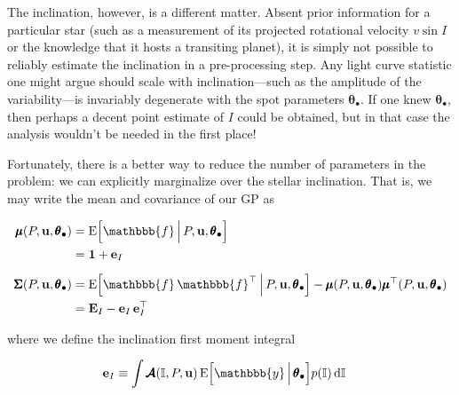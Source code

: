\documentclass[modern,linenumbers]{aastex62}
\begin{document}
The inclination, however, is a different matter. Absent prior information
for a particular star (such as a measurement of its projected rotational
velocity $v\sin I$ or the knowledge that it hosts a transiting planet), it
is simply not possible to reliably estimate the inclination in a
pre-processing step. Any light curve statistic one might argue should scale
with inclination---such as the amplitude of the variability---is invariably
degenerate with the spot parameters $\pmb{\theta}_\bullet$. If one knew
$\pmb{\theta}_\bullet$, then perhaps a decent point estimate of $I$ could
be obtained, but in that case the analysis wouldn't be needed in the first place!
%

Fortunately, there is a better way to reduce the number of parameters in
the problem: we can explicitly marginalize over the stellar inclination.
That is, we may write the mean and covariance of our GP as
%
%
\begin{linenomath}\begin{align}
        \label{eq:mu_marg}
        \pmb{\mu}(P, \mathbf{u}, \pmb{\theta}_\bullet)
         & = \mathrm{E} \Big[ \mathbbb{f} \, \Big| \, P, \mathbf{u}, \pmb{\theta}_\bullet \Big]
        \nonumber                                                                                                                                                                                                        \\
         & = \mathbf{1} + \mathbf{e}_I
        \\[0.5em]
        \label{eq:cov_marg}
        \pmb{\Sigma}(P, \mathbf{u}, \pmb{\theta}_\bullet)
         & = \mathrm{E} \Big[ \mathbbb{f} \, \mathbbb{f}^\top \, \Big| \, P, \mathbf{u}, \pmb{\theta}_\bullet \Big] - \pmb{\mu}(P, \mathbf{u}, \pmb{\theta}_\bullet) \pmb{\mu}^\top(P, \mathbf{u}, \pmb{\theta}_\bullet)
        \nonumber                                                                                                                                                                                                        \\
         & =
        \mathbf{E}_I
        -
        \mathbf{e}_I \,
        \mathbf{e}_I^\top
    \end{align}\end{linenomath}
%
where we define the inclination first moment integral
%
\begin{linenomath}\begin{align}
        \label{eq:eI}
        \mathbf{e}_I
         & \equiv
        \int
        \pmb{\mathcal{A}}(\mathbb{I}, P, \mathbf{u}) \,
        \mathrm{E} \Big[ \mathbbb{y} \, \Big| \, \pmb{\theta}_\bullet \Big]
        p(\mathbb{I}) \, \mathrm{d}\mathbb{I}
    \end{align}\end{linenomath}
\end{document}
